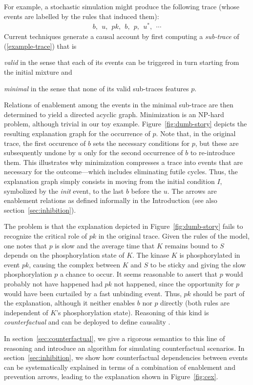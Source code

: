 For example, a stochastic simulation might produce the following trace
(whose events are labelled by the rules that induced them):
\begin{align}
  \label{example-trace} b,\ \ u,\ \ pk,\ \ b,\ \ p,\ \
  u^{*},\ \ \cdots
\end{align} 
Current
techniques \cite{DBLP:conf/fsttcs/DanosFFHH12,DanosEtAl-CONCUR07}
generate a causal account by first computing a \emph{sub-trace} of
(\ref{example-trace}) that is
\begin{inparaenum}[(i)]
\item \emph{valid} in the sense that each of its events can be
  triggered in turn starting from the initial mixture and
\item \emph{minimal} in the sense that none of its valid sub-traces
  features $p$.
\end{inparaenum}
Relations of enablement among the events in the minimal sub-trace are
then determined to yield a directed acyclic graph. Minimization is an NP-hard problem, although trivial in our toy
example. Figure~\ref{fig:dumb-story} depicts the resulting explanation graph for
the occurrence of $p$. Note that, in the original trace, the first
occurence of $b$ sets the necessary conditions for $p$, but these are
subsequently undone by $u$ only for the second occurrence of $b$ to
re-introduce them. This illustrates why minimization compresses a
trace into events that are necessary for the outcome---which includes
eliminating futile cycles. Thus, the explanation graph simply consists
in moving from the initial condition $I$, symbolized by the
\emph{init} event, to the last $b$ before the $u$. The arrows are
enablement relations as defined informally in the Introduction (see
also section~\ref{sec:inhibition}).



The problem is that the explanation depicted in
Figure~\ref{fig:dumb-story} fails to recognize the critical role of
$pk$ in the original trace. Given the rules of the model, one notes
that $p$ is slow and the average time that $K$ remains bound to $S$
depends on the phosphorylation state of $K$. The kinase $K$ is
phosphorylated in event $pk$, causing the complex between $K$ and $S$
to be sticky and giving the slow phosphorylation $p$ a chance to
occur. It seems reasonable to assert that $p$ would probably not have
happened had $pk$ not happened, since the opportunity for $p$ would
have been curtailed by a fast unbinding event. Thus, $pk$ should be
part of the explanation, although it neither enables $b$ nor $p$
directly (both rules are independent of $K$'s phosphorylation
state). Reasoning of this kind is \emph{counterfactual} and can be
deployed to define causality
\cite{lewis1974causation,pearl2009causality}.

In section~\ref{sec:counterfactual}, we give a rigorous semantics to
this line of reasoning and introduce an algorithm for simulating
counterfactual scenarios. In section~\ref{sec:inhibition}, we show how
counterfactual dependencies between events can be systematically
explained in terms of a combination of enablement and prevention
arrows, leading to the explanation shown in Figure~\ref{fig:cex}. 
